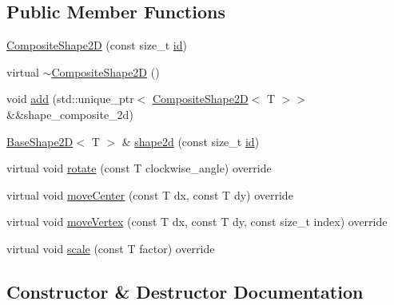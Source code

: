 \subsection*{Public Member Functions}
\begin{DoxyCompactItemize}
\item 
\hyperlink{classGraphicalEditorCore_1_1CompositeShape2D_af8dcc9f1047e1594cfbe61b62dd6a0ce}{Composite\+Shape2D} (const size\+\_\+t \hyperlink{classGraphicalEditorCore_1_1BaseShape2D_ac66cfa23289ae36d70ff6b7c41dd791f}{id})
\item 
virtual \hyperlink{classGraphicalEditorCore_1_1CompositeShape2D_a0a5658b8caf83f1578ed32b762e5db2c}{$\sim$\+Composite\+Shape2D} ()
\item 
void \hyperlink{classGraphicalEditorCore_1_1CompositeShape2D_a7ef78e00f1b0a673c2a3900a8bb5eca4}{add} (std\+::unique\+\_\+ptr$<$ \hyperlink{classGraphicalEditorCore_1_1CompositeShape2D}{Composite\+Shape2D}$<$ T $>$$>$ \&\&shape\+\_\+composite\+\_\+2d)
\item 
\hyperlink{classGraphicalEditorCore_1_1BaseShape2D}{Base\+Shape2D}$<$ T $>$ \& \hyperlink{classGraphicalEditorCore_1_1CompositeShape2D_a21d5c8c7348a3df1fdbd71e7605e991c}{shape2d} (const size\+\_\+t \hyperlink{classGraphicalEditorCore_1_1BaseShape2D_ac66cfa23289ae36d70ff6b7c41dd791f}{id})
\item 
virtual void \hyperlink{classGraphicalEditorCore_1_1CompositeShape2D_a1ad124ab5448a4276d06742318744473}{rotate} (const T clockwise\+\_\+angle) override
\item 
virtual void \hyperlink{classGraphicalEditorCore_1_1CompositeShape2D_a16cb9751cbd8f587f7f68ce831314e14}{move\+Center} (const T dx, const T dy) override
\item 
virtual void \hyperlink{classGraphicalEditorCore_1_1CompositeShape2D_a2754d592f39a2c442681fad8039e682f}{move\+Vertex} (const T dx, const T dy, const size\+\_\+t index) override
\item 
virtual void \hyperlink{classGraphicalEditorCore_1_1CompositeShape2D_ae1d0a3270ae8eeec8a87c5a37d657336}{scale} (const T factor) override
\end{DoxyCompactItemize}


\subsection{Constructor \& Destructor Documentation}
